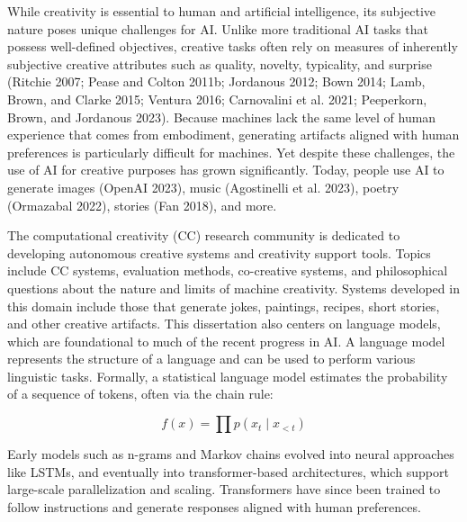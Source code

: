 \documentclass[phd,electronic,oneside,twosidetoc,letterpaper,chaptercenter,parttop,lof]{byumsphd}
\begin{document}
While creativity is essential to human and artificial intelligence, its subjective nature poses unique challenges for AI.
Unlike more traditional AI tasks that possess well-defined objectives, creative tasks often rely on measures of inherently subjective creative attributes such as quality, novelty, typicality, and surprise (Ritchie 2007; Pease and Colton 2011b; Jordanous 2012; Bown 2014; Lamb, Brown, and Clarke 2015; Ventura 2016; Carnovalini et al. 2021; Peeperkorn, Brown, and Jordanous 2023). 
Because machines lack the same level of human experience that comes from embodiment, generating artifacts aligned with human preferences is particularly difficult for machines. 
Yet despite these challenges, the use of AI for creative purposes has grown significantly. 
Today, people use AI to generate images (OpenAI 2023), music (Agostinelli et al. 2023), poetry (Ormazabal 2022), stories (Fan 2018), and more.

The computational creativity (CC) research community is dedicated to developing autonomous creative systems and creativity support tools.
Topics include CC systems, evaluation methods, co-creative systems, and philosophical questions about the nature and limits of machine creativity.
Systems developed in this domain include those that generate jokes, paintings, recipes, short stories, and other creative artifacts.
This dissertation also centers on language models, which are foundational to much of the recent progress in AI.
A language model represents the structure of a language and can be used to perform various linguistic tasks.
Formally, a statistical language model estimates the probability of a sequence of tokens, often via the chain rule:

\[
f(x) = \prod p(x_t \mid x_{<t})
\]

Early models such as n-grams and Markov chains evolved into neural approaches like LSTMs, and eventually into transformer-based architectures, which support large-scale parallelization and scaling.
Transformers have since been trained to follow instructions and generate responses aligned with human preferences. 
\end{document}
